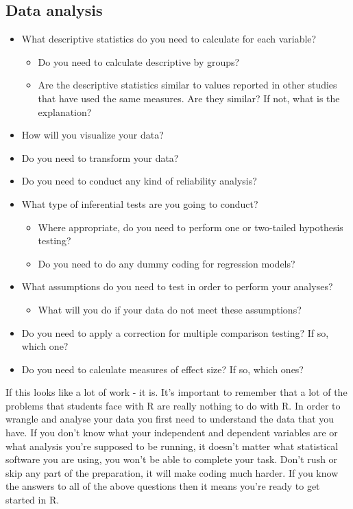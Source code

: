 \documentclass[]{book}
\providecommand{\tightlist}{%
  \setlength{\itemsep}{0pt}\setlength{\parskip}{0pt}}
\begin{document}
\hypertarget{data-analysis}{%
\subsection{Data analysis}\label{data-analysis}}

\begin{itemize}
\tightlist
\item
  What descriptive statistics do you need to calculate for each variable?

  \begin{itemize}
  \tightlist
  \item
    Do you need to calculate descriptive by groups?
  \item
    Are the descriptive statistics similar to values reported in other studies that have used the same measures. Are they similar? If not, what is the explanation?
  \end{itemize}
\item
  How will you visualize your data?
\item
  Do you need to transform your data?
\item
  Do you need to conduct any kind of reliability analysis?
\item
  What type of inferential tests are you going to conduct?

  \begin{itemize}
  \tightlist
  \item
    Where appropriate, do you need to perform one or two-tailed hypothesis testing?\\
  \item
    Do you need to do any dummy coding for regression models?\\
  \end{itemize}
\item
  What assumptions do you need to test in order to perform your analyses?

  \begin{itemize}
  \tightlist
  \item
    What will you do if your data do not meet these assumptions?
  \end{itemize}
\item
  Do you need to apply a correction for multiple comparison testing? If so, which one?
\item
  Do you need to calculate measures of effect size? If so, which ones?
\end{itemize}

If this looks like a lot of work - it is. It's important to remember that a lot of the problems that students face with R are really nothing to do with R. In order to wrangle and analyse your data you first need to understand the data that you have. If you don't know what your independent and dependent variables are or what analysis you're supposed to be running, it doesn't matter what statistical software you are using, you won't be able to complete your task. Don't rush or skip any part of the preparation, it will make coding much harder. If you know the answers to all of the above questions then it means you're ready to get started in R.
\end{document}
